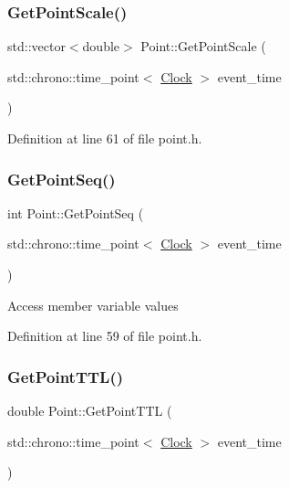 \subsubsection{\texorpdfstring{Get\+Point\+Scale()}{GetPointScale()}}
{\footnotesize\ttfamily std\+::vector$<$double$>$ Point\+::\+Get\+Point\+Scale (\begin{DoxyParamCaption}\item[{std\+::chrono\+::time\+\_\+point$<$ \mbox{\hyperlink{universe_8h_a0ef8d951d1ca5ab3cfaf7ab4c7a6fd80}{Clock}} $>$}]{event\+\_\+time }\end{DoxyParamCaption})\hspace{0.3cm}{\ttfamily [inline]}}



Definition at line 61 of file point.\+h.

\mbox{\label{class_point_a04bae1bb3475d1e5d97ddd7b2dae40aa}} 
\subsubsection{\texorpdfstring{Get\+Point\+Seq()}{GetPointSeq()}}
{\footnotesize\ttfamily int Point\+::\+Get\+Point\+Seq (\begin{DoxyParamCaption}\item[{std\+::chrono\+::time\+\_\+point$<$ \mbox{\hyperlink{universe_8h_a0ef8d951d1ca5ab3cfaf7ab4c7a6fd80}{Clock}} $>$}]{event\+\_\+time }\end{DoxyParamCaption})\hspace{0.3cm}{\ttfamily [inline]}}

Access member variable values 

Definition at line 59 of file point.\+h.

\mbox{\label{class_point_a72cf99a391fc3d6ea8f4252f4f92c19f}} 
\subsubsection{\texorpdfstring{Get\+Point\+T\+T\+L()}{GetPointTTL()}}
{\footnotesize\ttfamily double Point\+::\+Get\+Point\+T\+TL (\begin{DoxyParamCaption}\item[{std\+::chrono\+::time\+\_\+point$<$ \mbox{\hyperlink{universe_8h_a0ef8d951d1ca5ab3cfaf7ab4c7a6fd80}{Clock}} $>$}]{event\+\_\+time }\end{DoxyParamCaption})\hspace{0.3cm}{\ttfamily [inline]}}




